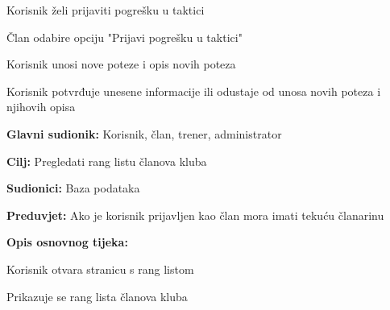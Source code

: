 \begin{packed_item}
\begin{packed_item}
\begin{packed_enum}
						\end{packed_enum}
					
						\item[3.b] Korisnik želi prijaviti pogrešku u taktici
					\item[] \begin{packed_enum}
						
						\item Član odabire opciju "Prijavi pogrešku u taktici"
						\item Korisnik unosi nove poteze i opis novih poteza
						\item Korisnik potvrđuje unesene informacije ili odustaje od unosa novih poteza i njihovih opisa
							\end{packed_enum}
						\end{packed_item}
					\end{packed_item}
					
					\eject

					\noindent {}
					\begin{packed_item}
	
						\item \textbf{Glavni sudionik: }Korisnik, član, trener, administrator
						\item  \textbf{Cilj: }Pregledati rang listu članova kluba
						\item  \textbf{Sudionici: }Baza podataka
						\item  \textbf{Preduvjet: }Ako je korisnik prijavljen kao član mora imati tekuću članarinu
						\item  \textbf{Opis osnovnog tijeka:}
						
						\item[] \begin{packed_enum}
	
							\item Korisnik otvara stranicu s rang listom
							\item Prikazuje se rang lista članova kluba
							
						\end{packed_enum}
					\end{packed_item}
					
